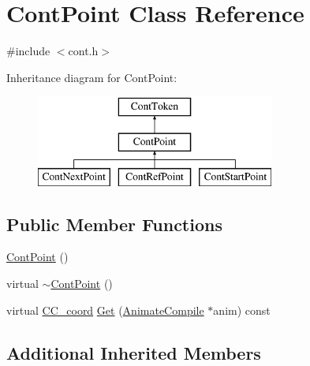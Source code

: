 \hypertarget{a00062}{\section{Cont\-Point Class Reference}
\label{a00062}
}


{\ttfamily \#include $<$cont.\-h$>$}

Inheritance diagram for Cont\-Point\-:\begin{figure}[H]
\begin{center}
\leavevmode
\includegraphics[height=3.000000cm]{a00062}
\end{center}
\end{figure}
\subsection*{Public Member Functions}
\begin{DoxyCompactItemize}
\item 
\hyperlink{a00062_a29f0b6e1212175fd0e963eaa3dae7aa4}{Cont\-Point} ()
\item 
virtual \hyperlink{a00062_af3235650468553a0bc1d06c666fb4c33}{$\sim$\-Cont\-Point} ()
\item 
virtual \hyperlink{a00029}{C\-C\-\_\-coord} \hyperlink{a00062_a1a51c628c19099b02f875c9bfb373a81}{Get} (\hyperlink{a00007}{Animate\-Compile} $\ast$anim) const 
\end{DoxyCompactItemize}
\subsection*{Additional Inherited Members}


